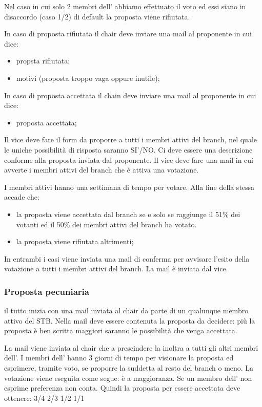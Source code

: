 Nel caso in cui solo 2 membri dell'\EC{} abbiamo effettuato il voto ed essi siano in disaccordo (caso 1/2) di default la proposta viene rifiutata.

In caso di proposta rifiutata il chair deve inviare una mail al proponente in cui dice:
\begin{itemize}
	\item propsta rifiutata;
	\item motivi (proposta troppo vaga oppure inutile);
\end{itemize}

In caso di proposta accettata il chain deve inviare una mail al proponente in cui dice:
\begin{itemize}
	\item proposta accettata;
\end{itemize}

Il vice deve fare il form da proporre a tutti i membri attivi del branch, nel quale le uniche possibilità di risposta saranno SI'/NO. Ci deve essere una descrizione conforme alla proposta inviata dal proponente. 
Il vice deve fare una mail in cui avverte i membri attivi del branch che è attiva una votazione.

I membri attivi hanno una settimana di tempo per votare. Alla fine della stessa accade che:

\begin{itemize}
	\item la proposta viene accettata dal branch se e solo se raggiunge il 51\% dei votanti ed il 50\% dei membri attivi del branch ha votato.
	\item la proposta viene rifiutata altrimenti;
\end{itemize}

In entrambi i casi viene inviata una mail di conferma per  avvisare l'esito della votazione a tutti i membri attivi del branch. La mail è inviata dal vice.

\subsubsection{Proposta pecuniaria}

il tutto inizia con una mail inviata al chair da parte di un qualunque membro attivo del STB. Nella mail deve essere contenuta la proposta da decidere: più la proposta è ben scritta maggiori saranno le possibilità che venga accettata. 

La mail viene inviata al chair che a prescindere la inoltra a tutti gli altri membri dell'\EC{}. I membri dell'\EC{} hanno 3 giorni di tempo per visionare la proposta ed esprimere, tramite voto, se proporre la suddetta al resto del branch o meno.
La votazione viene eseguita come segue:
è a maggioranza. Se un membro dell'\EC{} non esprime preferenza non conta. Quindi la proposta per essere accettata deve ottenere:
3/4
2/3
1/2
1/1

